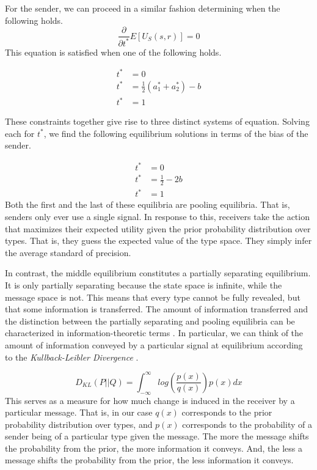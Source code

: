 \documentclass[12pt]{article}
\theoremstyle{definition} \newtheorem{definition}{Definition}
\begin{document}
For the sender, we can proceed in a similar fashion determining when the following holds.
\begin{equation}
 \frac{\partial}{\partial t^*}E[U_S(s, r)] = 0
\end{equation}
This equation is satisfied when one of the following holds.

\begin{equation}
     \begin{split}
 	t^* &= 0\\
	t^* &= \frac{1}{2}(a_1^* + a_2^*) - b\\
	t^* &= 1
     \end{split}
\end{equation}

These constraints together give rise to three distinct systems of equation. Solving each for $t^*$, we find the following equilibrium solutions in terms of the bias of the sender.

\begin{equation}
\begin{split}
     t^* &= 0\\
     t^* &= \frac{1}{2} - 2b\\
     t^* &= 1
\end{split}
\end{equation}
Both the first and the last of these equilibria are pooling equilibria. That is, senders only ever use a single signal. In response to this, receivers take the action that maximizes their expected utility given the prior probability distribution over types. That is, they guess the expected value of the type space. They simply infer the average standard of precision.

In contrast, the middle equilibrium constitutes a partially separating equilibrium. It is only partially separating because the state space is infinite, while the message space is not. This means that every type cannot be fully revealed, but that some information is transferred. The amount of information transferred and the distinction between the partially separating and pooling equilibria can be characterized in information-theoretic terms \citep{shannon:1948}. In particular, we can think of the amount of information conveyed by a particular signal at equilibrium according to the \emph{Kullback-Leibler Divergence} \citeyearpar{kullback-leibler1951divergence}.

\begin{equation}
     D_{KL}(P || Q) = \int_{-\infty}^{\infty} log\left( \frac{p(x)}{q(x)}  \right)p(x) dx
\end{equation}
This serves as a measure for how much change is induced in the receiver by a particular message. That is, in our case $q(x)$ corresponds to the prior probability distribution over types, and $p(x)$ corresponds to the probability of a sender being of a particular type given the message. The more the message shifts the probability from the prior, the more information it conveys. And, the less a message shifts the probability from the prior, the less information it conveys. 
\end{document}
